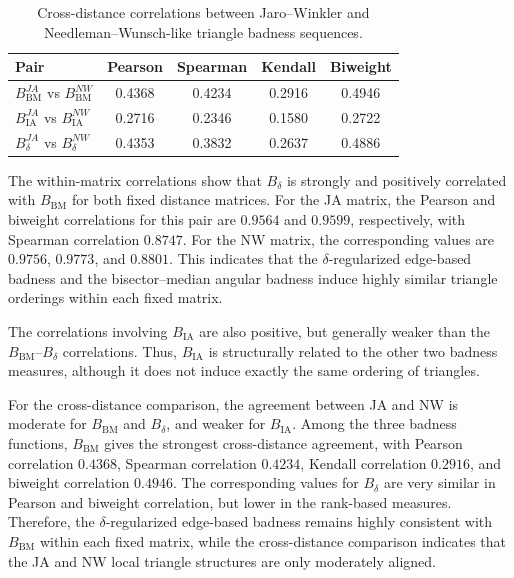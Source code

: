 \documentclass[11pt]{article}
\begin{document}
\begin{table}[h!]
\centering
\caption{Cross-distance correlations between Jaro--Winkler and Needleman--Wunsch-like triangle badness sequences.}
\label{tab:fixed_biological_cross_corr}
\small
\setlength{\tabcolsep}{6pt}
\begin{tabular}{lcccc}
\hline
Pair & Pearson & Spearman & Kendall & Biweight \\
\hline
\(B_{\mathrm{BM}}^{JA}\) vs \(B_{\mathrm{BM}}^{NW}\) & 0.4368 & 0.4234 & 0.2916 & 0.4946 \\
\(B_{\mathrm{IA}}^{JA}\) vs \(B_{\mathrm{IA}}^{NW}\) & 0.2716 & 0.2346 & 0.1580 & 0.2722 \\
\(B_{\delta}^{JA}\) vs \(B_{\delta}^{NW}\)           & 0.4353 & 0.3832 & 0.2637 & 0.4886 \\
\hline
\end{tabular}
\end{table}

The within-matrix correlations show that \(B_{\delta}\) is strongly and positively correlated with \(B_{\mathrm{BM}}\) for both fixed distance matrices. For the JA matrix, the Pearson and biweight correlations for this pair are \(0.9564\) and \(0.9599\), respectively, with Spearman correlation \(0.8747\). For the NW matrix, the corresponding values are \(0.9756\), \(0.9773\), and \(0.8801\). This indicates that the \(\delta\)-regularized edge-based badness and the bisector--median angular badness induce highly similar triangle orderings within each fixed matrix.

The correlations involving \(B_{\mathrm{IA}}\) are also positive, but generally weaker than the \(B_{\mathrm{BM}}\)--\(B_{\delta}\) correlations. Thus, \(B_{\mathrm{IA}}\) is structurally related to the other two badness measures, although it does not induce exactly the same ordering of triangles.

For the cross-distance comparison, the agreement between JA and NW is moderate for \(B_{\mathrm{BM}}\) and \(B_{\delta}\), and weaker for \(B_{\mathrm{IA}}\). Among the three badness functions, \(B_{\mathrm{BM}}\) gives the strongest cross-distance agreement, with Pearson correlation \(0.4368\), Spearman correlation \(0.4234\), Kendall correlation \(0.2916\), and biweight correlation \(0.4946\). The corresponding values for \(B_{\delta}\) are very similar in Pearson and biweight correlation, but lower in the rank-based measures. Therefore, the \(\delta\)-regularized edge-based badness remains highly consistent with \(B_{\mathrm{BM}}\) within each fixed matrix, while the cross-distance comparison indicates that the JA and NW local triangle structures are only moderately aligned.
\end{document}
